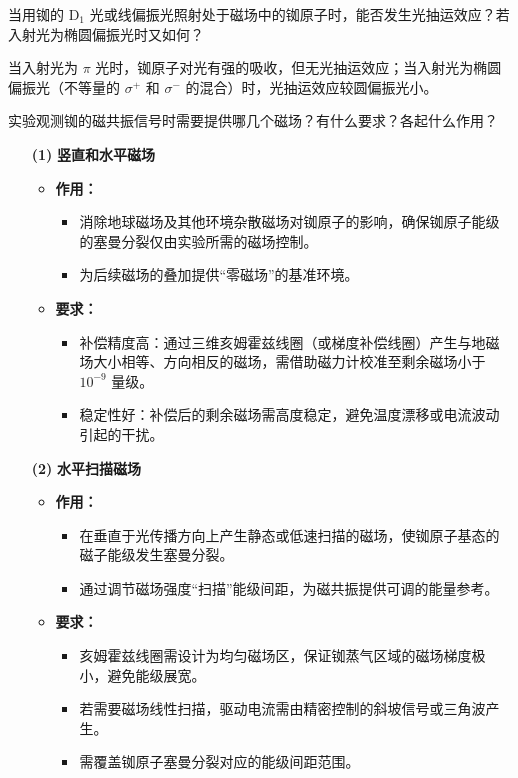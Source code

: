 \begin{question}
当用铷的 D$_1$ 光或线偏振光照射处于磁场中的铷原子时，能否发生光抽运效应？若入射光为椭圆偏振光时又如何？
\end{question}

当入射光为 $\pi$ 光时，铷原子对光有强的吸收，但无光抽运效应；当入射光为椭圆偏振光（不等量的 $\sigma^+$ 和 $\sigma^-$ 的混合）时，光抽运效应较圆偏振光小。

\begin{question}
实验观测铷的磁共振信号时需要提供哪几个磁场？有什么要求？各起什么作用？
\end{question}
\begin{itemize}
    \item[\textbf{(1)}] \textbf{竖直和水平磁场}
    \begin{itemize}
        \item \textbf{作用：} 
        \begin{itemize}
            \item 消除地球磁场及其他环境杂散磁场对铷原子的影响，确保铷原子能级的塞曼分裂仅由实验所需的磁场控制。
            \item 为后续磁场的叠加提供“零磁场”的基准环境。
        \end{itemize}
        \item \textbf{要求：}
        \begin{itemize}
            \item 补偿精度高：通过三维亥姆霍兹线圈（或梯度补偿线圈）产生与地磁场大小相等、方向相反的磁场，需借助磁力计校准至剩余磁场小于 $10^{-9}$ 量级。
            \item 稳定性好：补偿后的剩余磁场需高度稳定，避免温度漂移或电流波动引起的干扰。
        \end{itemize}
    \end{itemize}

    \item[\textbf{(2)}] \textbf{水平扫描磁场}
    \begin{itemize}
        \item \textbf{作用：} 
        \begin{itemize}
            \item 在垂直于光传播方向上产生静态或低速扫描的磁场，使铷原子基态的磁子能级发生塞曼分裂。
            \item 通过调节磁场强度“扫描”能级间距，为磁共振提供可调的能量参考。
        \end{itemize}
        \item \textbf{要求：}
        \begin{itemize}
            \item 亥姆霍兹线圈需设计为均匀磁场区，保证铷蒸气区域的磁场梯度极小，避免能级展宽。
            \item 若需要磁场线性扫描，驱动电流需由精密控制的斜坡信号或三角波产生。
            \item 需覆盖铷原子塞曼分裂对应的能级间距范围。
        \end{itemize}
    \end{itemize}


\end{itemize}
